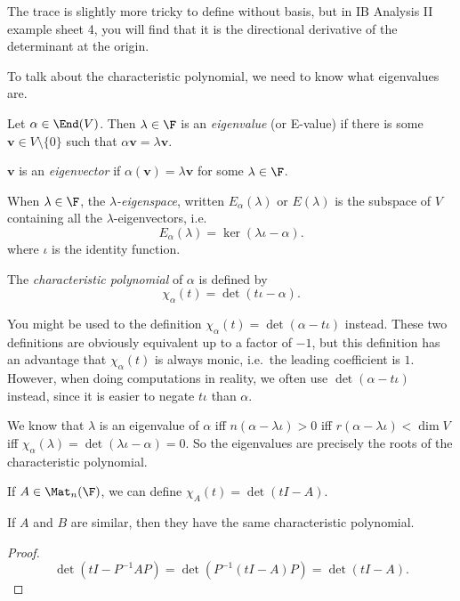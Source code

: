 \documentclass[a4paper]{article}
\begin{document}
The trace is slightly more tricky to define without basis, but in IB Analysis II example sheet 4, you will find that it is the directional derivative of the determinant at the origin.

To talk about the characteristic polynomial, we need to know what eigenvalues are.
\begin{defi}
  Let $\alpha \in \End(V)$. Then $\lambda \in \F$ is an \emph{eigenvalue} (or E-value) if there is some $\mathbf{v} \in V\setminus \{0\}$ such that $\alpha \mathbf{v} = \lambda \mathbf{v}$.

  $\mathbf{v}$ is an \emph{eigenvector} if $\alpha(\mathbf{v}) = \lambda \mathbf{v}$ for some $\lambda \in \F$.

  When $\lambda \in \F$, the \emph{$\lambda$-eigenspace}, written $E_\alpha(\lambda)$ or $E(\lambda)$ is the subspace of $V$ containing all the $\lambda$-eigenvectors, i.e.
  \[
    E_\alpha(\lambda) = \ker (\lambda \iota - \alpha).
  \]
  where $\iota$ is the identity function.
\end{defi}
\begin{defi}
  The \emph{characteristic polynomial} of $\alpha$ is defined by
  \[
    \chi_\alpha(t) = \det (t\iota - \alpha).
  \]
\end{defi}
You might be used to the definition $\chi_\alpha(t) = \det(\alpha - t \iota)$ instead. These two definitions are obviously equivalent up to a factor of $-1$, but this definition has an advantage that $\chi_\alpha(t)$ is always monic, i.e.\ the leading coefficient is $1$. However, when doing computations in reality, we often use $\det (\alpha - t\iota)$ instead, since it is easier to negate $t \iota$ than $\alpha$.

We know that $\lambda$ is an eigenvalue of $\alpha$ iff $n(\alpha - \lambda \iota) > 0$ iff $r(\alpha - \lambda \iota) < \dim V$ iff $\chi_\alpha(\lambda) = \det(\lambda \iota - \alpha) = 0$. So the eigenvalues are precisely the roots of the characteristic polynomial.

If $A \in \Mat_n(\F)$, we can define $\chi_A(t) = \det (tI - A)$.
\begin{lemma}
  If $A$ and $B$ are similar, then they have the same characteristic polynomial.
\end{lemma}

\begin{proof}
  \[
    \det (tI - P^{-1}AP) = \det(P^{-1}(tI - A)P) = \det(tI - A).
  \]
\end{proof}
\end{document}
